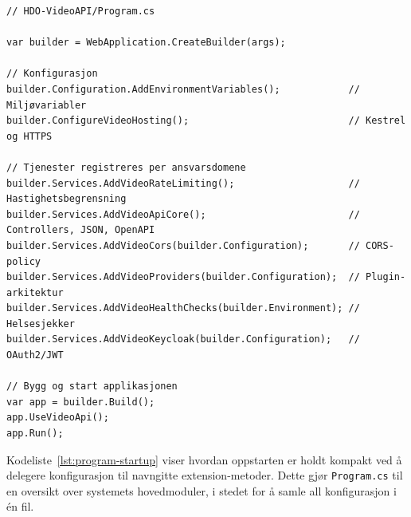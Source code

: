 \begin{lstlisting}[language=CSharp, caption={Oppstartskonfigurasjon delegert til navngitte extension-metoder}, label={lst:program-startup}]
// HDO-VideoAPI/Program.cs

var builder = WebApplication.CreateBuilder(args);

// Konfigurasjon
builder.Configuration.AddEnvironmentVariables();            // Miljøvariabler
builder.ConfigureVideoHosting();                            // Kestrel og HTTPS

// Tjenester registreres per ansvarsdomene
builder.Services.AddVideoRateLimiting();                    // Hastighetsbegrensning
builder.Services.AddVideoApiCore();                         // Controllers, JSON, OpenAPI
builder.Services.AddVideoCors(builder.Configuration);       // CORS-policy
builder.Services.AddVideoProviders(builder.Configuration);  // Plugin-arkitektur
builder.Services.AddVideoHealthChecks(builder.Environment); // Helsesjekker 
builder.Services.AddVideoKeycloak(builder.Configuration);   // OAuth2/JWT

// Bygg og start applikasjonen
var app = builder.Build();
app.UseVideoApi();
app.Run();
\end{lstlisting}
Kodeliste~\ref{lst:program-startup} viser hvordan oppstarten er holdt kompakt ved å delegere konfigurasjon til navngitte extension-metoder. Dette gjør \texttt{Program.cs} til en oversikt over systemets hovedmoduler, i stedet for å samle all konfigurasjon i én fil.